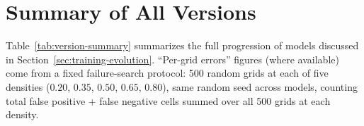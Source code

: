 \section{Summary of All Versions}
\label{sec:results-table}

Table~\ref{tab:version-summary} summarizes the full progression of models
discussed in Section~\ref{sec:training-evolution}. ``Per-grid errors''
figures (where available) come from a fixed failure-search protocol: 500
random grids at each of five densities ($0.20$, $0.35$, $0.50$, $0.65$,
$0.80$), same random seed across models, counting total false
positive + false negative cells summed over all 500 grids at each density.

\begin{table}[htbp]
\centering
\small
{}
\caption{Version summary. \textsuperscript{a}V6's best epoch (5) before
divergence; the model never recovers after this point.}
\label{tab:version-summary}
\end{table}

